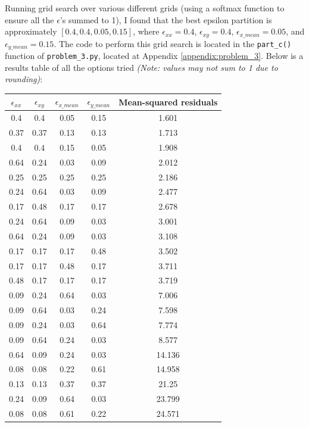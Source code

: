 \documentclass[12pt]{article}
\def\cl{\lstinline}
\begin{document}
\noindent

Running grid search over various different grids (using a softmax function to ensure all the $\epsilon$'s summed to 1), I found that the best epsilon partition is approximately $[0.4, 0.4, 0.05, 0.15]$, where $\epsilon_{xx} = 0.4$, $\epsilon_{xy} = 0.4$, $\epsilon_{x\_mean} = 0.05$, and $\epsilon_{y\_mean} = 0.15$. The code to perform this grid search is located in the \cl{part_c()} function of \cl{problem_3.py}, located at Appendix \ref{appendix:problem_3}. Below is a results table of all the options tried \textit{(Note: values may not sum to 1 due to rounding)}:

\begin{center}
\begin{tabular}{|c|c|c|c|c|}
\hline
 $\epsilon_{xx}$ & $\epsilon_{xy}$ & $\epsilon_{x\_mean}$ & $\epsilon_{y\_mean}$ & Mean-squared residuals \\ \hline
0.4 & 0.4 & 0.05 & 0.15&1.601\\ \hline
0.37 & 0.37 & 0.13 & 0.13&1.713\\ \hline
0.4 & 0.4 & 0.15 & 0.05&1.908\\ \hline
0.64 & 0.24 & 0.03 & 0.09&2.012\\ \hline
0.25 & 0.25 & 0.25 & 0.25&2.186\\ \hline
0.24 & 0.64 & 0.03 & 0.09&2.477\\ \hline
0.17 & 0.48 & 0.17 & 0.17&2.678\\ \hline
0.24 & 0.64 & 0.09 & 0.03&3.001\\ \hline
0.64 & 0.24 & 0.09 & 0.03&3.108\\ \hline
0.17 & 0.17 & 0.17 & 0.48&3.502\\ \hline
0.17 & 0.17 & 0.48 & 0.17&3.711\\ \hline
0.48 & 0.17 & 0.17 & 0.17&3.719\\ \hline
0.09 & 0.24 & 0.64 & 0.03&7.006\\ \hline
0.09 & 0.64 & 0.03 & 0.24&7.598\\ \hline
0.09 & 0.24 & 0.03 & 0.64&7.774\\ \hline
0.09 & 0.64 & 0.24 & 0.03&8.577\\ \hline
0.64 & 0.09 & 0.24 & 0.03&14.136\\ \hline
0.08 & 0.08 & 0.22 & 0.61&14.958\\ \hline
0.13 & 0.13 & 0.37 & 0.37&21.25\\ \hline
0.24 & 0.09 & 0.64 & 0.03&23.799\\ \hline
0.08 & 0.08 & 0.61 & 0.22&24.571\\ \hline

\end{tabular}
\end{center}
\end{document}
